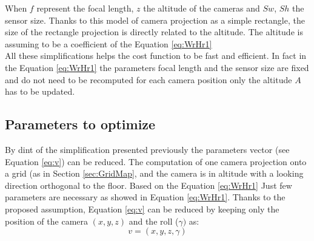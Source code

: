 
When $f$ represent the focal length, $z$ the altitude of the cameras and  $Sw$, $Sh$ the sensor size.
Thanks to this model of camera projection as a simple rectangle, the size of the rectangle projection is directly related to the altitude. The altitude is assuming to be a coefficient of the Equation \ref{eq:WrHr1}\\
All these simplifications helps the cost function to be fast and efficient.  In fact in the Equation \ref{eq:WrHr1} the parameters focal length and the sensor size are fixed and do not need to be recomputed for each camera position only the altitude $A$ has to be updated.\\

\subsection{Parameters to optimize }\label{sec:parameterToOptimize}
By dint of the simplification presented previously the parameters vector (see Equation \ref{eq:v}) can be reduced.
The computation of one camera projection onto a grid (as in Section \ref{sec:GridMap}, and the camera is in altitude with a looking direction orthogonal to the floor. Based on the Equation \ref{eq:WrHr1}
Just few parameters are necessary as showed in Equation \ref{eq:WrHr1}. Thanks to the proposed assumption,  Equation \ref{eq:v} can be reduced by keeping only the position of the camera $(x,y,z)$ and the roll ($\gamma)$ as:
	\begin{equation}\label{eq:v2}
		v=(x,y,z,\gamma ) 
	\end{equation}

